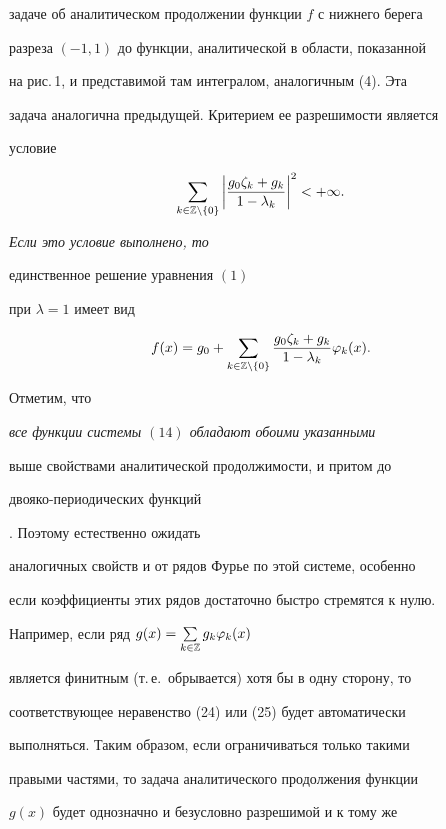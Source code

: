 задаче об аналитическом продолжении функции $f$ с нижнего берега


разреза $(-1,1)$ до функции, аналитической в области, показанной


на рис.\,1, и представимой там интегралом, аналогичным (4). Эта


задача аналогична предыдущей. Критерием ее разрешимости является


условие


\begin{equation}


\sum_{k\in \Bbb{Z}\setminus\{0\}}\bigg|\dfrac{g_{0}


\zeta_{k}+g_{k}}{1-\lambda_{k}}\bigg|^{2}<+\infty.


\end{equation}


{\it Если это условие выполнено, то


единственное решение уравнения $(1)$


при $\lambda=1$ имеет вид}


$$


f(x)=g_{0}+\sum_{k\in \Bbb{Z}\setminus\{0\}}


\dfrac{g_{0}\zeta_{k}+g_{k}}{1-\lambda_{k}}


\varphi_{k}(x).


$$





Отметим, что {\it все функции системы $(14)$ обладают обоими указанными


выше свойствами аналитической продолжимости, и притом до


двояко-периодических функций}. Поэтому естественно ожидать


аналогичных свойств и от рядов Фурье по этой системе, особенно


если коэффициенты этих рядов достаточно быстро стремятся к нулю.


Например, если ряд $g(x)=\sum\limits_{k\in\Bbb{Z}}g_{k}\varphi_{k}(x)$


является финитным (т.\,е.\ обрывается) хотя бы в одну сторону, то


соответствующее неравенство (24) или (25) будет автоматически


выполняться. Таким образом, если ограничиваться только такими


правыми частями, то задача аналитического продолжения функции


$g(x)$ будет однозначно и безусловно разрешимой и к тому же


